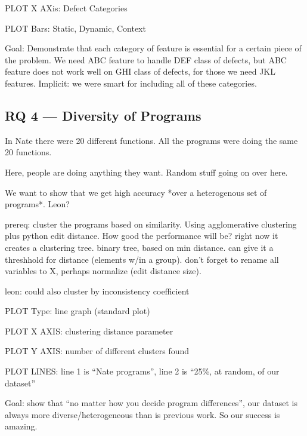 \documentclass[conference]{IEEEtran}
\begin{document}
PLOT X AXis: Defect Categories

PLOT Bars: Static, Dynamic, Context

Goal: Demonstrate that each category of feature is essential for a certain
piece of the problem. We need ABC feature to handle DEF class of defects,
but ABC feature does not work well on GHI class of defects, for those we
need JKL features. Implicit: we were smart for including all of these
categories.

\subsection{RQ 4 --- Diversity of Programs}

In Nate there were 20 different functions. All the programs were doing the
same 20 functions.

Here, people are doing anything they want. Random stuff going on over here.

We want to show that we get high accuracy *over a heterogenous set of
programs*. Leon?

prereq: cluster the programs based on similarity. Using agglomerative
clustering plus python edit distance. How good the performance will be?
right now it creates a clustering tree. binary tree, based on min distance.
can give it a threshhold for distance (elements w/in a group). don't forget
to rename all variables to X, perhaps normalize (edit distance size).

leon: could also cluster by inconsistency coefficient

PLOT Type: line graph (standard plot)

PLOT X AXIS: clustering distance parameter

PLOT Y AXIS: number of different clusters found

PLOT LINES: line 1 is ``Nate programs'', line 2 is ``25\%, at random, of our dataset''

Goal: show that ``no matter how you decide program differences'', our
dataset is always more diverse/heterogeneous than is previous work. So our
success is amazing.

\end{document}
